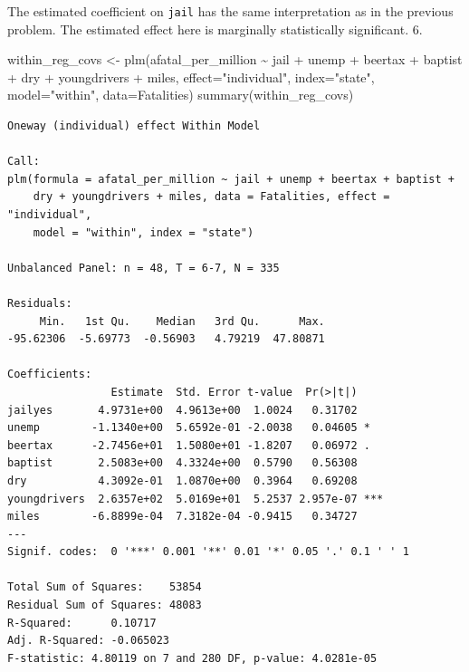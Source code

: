 \documentclass[
  letterpaper,
  DIV=11,
  numbers=noendperiod]{scrreprt}
\newenvironment{Shaded}{\begin{snugshade}}{\end{snugshade}}
\newcommand{\AttributeTok}[1]{\textcolor[rgb]{0.40,0.45,0.13}{#1}}
\newcommand{\FunctionTok}[1]{\textcolor[rgb]{0.28,0.35,0.67}{#1}}
\newcommand{\NormalTok}[1]{\textcolor[rgb]{0.00,0.23,0.31}{#1}}
\newcommand{\OtherTok}[1]{\textcolor[rgb]{0.00,0.23,0.31}{#1}}
\newcommand{\SpecialCharTok}[1]{\textcolor[rgb]{0.37,0.37,0.37}{#1}}
\newcommand{\StringTok}[1]{\textcolor[rgb]{0.13,0.47,0.30}{#1}}
\begin{document}
The estimated coefficient on \texttt{jail} has the same interpretation
as in the previous problem. The estimated effect here is marginally
statistically significant. 6.

\begin{Shaded}
\begin{Highlighting}[]
\NormalTok{within\_reg\_covs }\OtherTok{\textless{}{-}} \FunctionTok{plm}\NormalTok{(afatal\_per\_million }\SpecialCharTok{\textasciitilde{}}\NormalTok{ jail }\SpecialCharTok{+}\NormalTok{ unemp }\SpecialCharTok{+}\NormalTok{ beertax }\SpecialCharTok{+}\NormalTok{ baptist }\SpecialCharTok{+}\NormalTok{ dry }\SpecialCharTok{+}\NormalTok{ youngdrivers }\SpecialCharTok{+}\NormalTok{ miles,}
                       \AttributeTok{effect=}\StringTok{"individual"}\NormalTok{,}
                       \AttributeTok{index=}\StringTok{"state"}\NormalTok{, }\AttributeTok{model=}\StringTok{"within"}\NormalTok{,}
                       \AttributeTok{data=}\NormalTok{Fatalities)}
\FunctionTok{summary}\NormalTok{(within\_reg\_covs)}
\end{Highlighting}
\end{Shaded}

\begin{verbatim}
Oneway (individual) effect Within Model

Call:
plm(formula = afatal_per_million ~ jail + unemp + beertax + baptist + 
    dry + youngdrivers + miles, data = Fatalities, effect = "individual", 
    model = "within", index = "state")

Unbalanced Panel: n = 48, T = 6-7, N = 335

Residuals:
     Min.   1st Qu.    Median   3rd Qu.      Max. 
-95.62306  -5.69773  -0.56903   4.79219  47.80871 

Coefficients:
                Estimate  Std. Error t-value  Pr(>|t|)    
jailyes       4.9731e+00  4.9613e+00  1.0024   0.31702    
unemp        -1.1340e+00  5.6592e-01 -2.0038   0.04605 *  
beertax      -2.7456e+01  1.5080e+01 -1.8207   0.06972 .  
baptist       2.5083e+00  4.3324e+00  0.5790   0.56308    
dry           4.3092e-01  1.0870e+00  0.3964   0.69208    
youngdrivers  2.6357e+02  5.0169e+01  5.2537 2.957e-07 ***
miles        -6.8899e-04  7.3182e-04 -0.9415   0.34727    
---
Signif. codes:  0 '***' 0.001 '**' 0.01 '*' 0.05 '.' 0.1 ' ' 1

Total Sum of Squares:    53854
Residual Sum of Squares: 48083
R-Squared:      0.10717
Adj. R-Squared: -0.065023
F-statistic: 4.80119 on 7 and 280 DF, p-value: 4.0281e-05
\end{verbatim}
\end{document}
